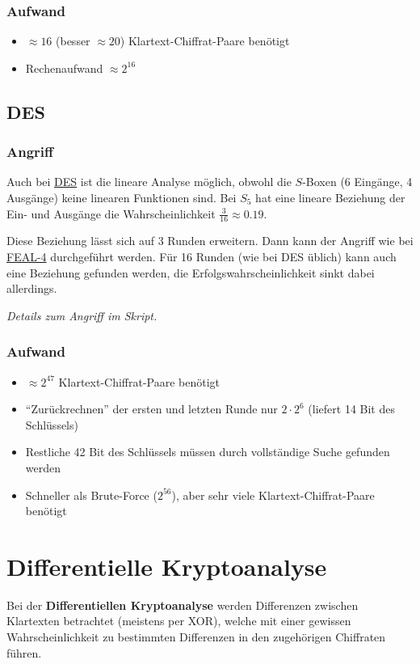 \documentclass[12pt,A4]{extarticle}
\newcommand{\highlight}[1]{\textcolor{highlightColor}{\textbf{#1}}}
\begin{document}
\subsubsection{Aufwand}
\begin{itemize}
  \item{$\approx 16$ (besser $\approx 20$) Klartext-Chiffrat-Paare benötigt}
  \item{Rechenaufwand $\approx 2^{16}$}
\end{itemize}

\subsection{DES}
\subsubsection{Angriff}
Auch bei \hyperref[sec:DES]{DES} ist die lineare Analyse möglich, obwohl die $S$-Boxen (6 Eingänge, 4 Ausgänge) keine linearen Funktionen sind. Bei $S_5$ hat eine lineare Beziehung der Ein- und Ausgänge die Wahrscheinlichkeit $\frac{3}{16} \approx 0.19$.\par
Diese Beziehung lässt sich auf 3 Runden erweitern. Dann kann der Angriff wie bei \hyperref[sec:feal4-angriff]{FEAL-4} durchgeführt werden. Für 16 Runden (wie bei DES üblich) kann auch eine Beziehung gefunden werden, die Erfolgswahrscheinlichkeit sinkt dabei allerdings.\par
\textit{Details zum Angriff im Skript.}

\subsubsection{Aufwand}
\begin{itemize}
  \item{$\approx 2^{47}$ Klartext-Chiffrat-Paare benötigt}
  \item{``Zurückrechnen'' der ersten und letzten Runde nur $2 \cdot 2^6$ (liefert 14 Bit des Schlüssels)}
  \item{Restliche 42 Bit des Schlüssels müssen durch vollständige Suche gefunden werden}
  \item{Schneller als Brute-Force ($2^{56}$), aber sehr viele  Klartext-Chiffrat-Paare benötigt}
\end{itemize}

\section{Differentielle Kryptoanalyse}
Bei der \highlight{Differentiellen Kryptoanalyse} werden Differenzen zwischen Klartexten betrachtet (meistens per XOR), welche mit einer gewissen Wahrscheinlichkeit zu bestimmten Differenzen in den zugehörigen Chiffraten führen.
\end{document}
